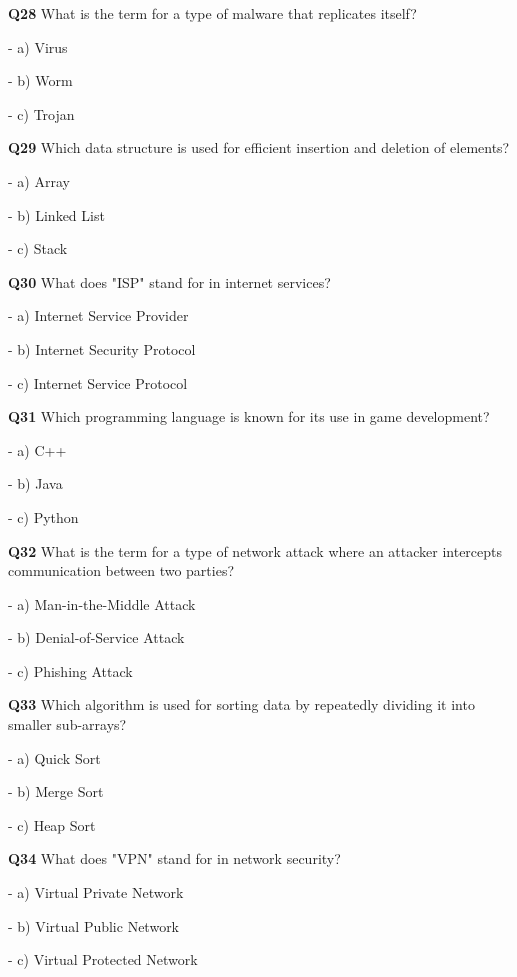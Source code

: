 \textbf{Q28} What is the term for a type of malware that replicates itself?\par
\quad - a) Virus\par
\quad - b) Worm\par
\quad - c) Trojan\par

\textbf{Q29} Which data structure is used for efficient insertion and deletion of elements?\par
\quad - a) Array\par
\quad - b) Linked List\par
\quad - c) Stack\par

\textbf{Q30} What does "ISP" stand for in internet services?\par
\quad - a) Internet Service Provider\par
\quad - b) Internet Security Protocol\par
\quad - c) Internet Service Protocol\par

\textbf{Q31} Which programming language is known for its use in game development?\par
\quad - a) C++\par
\quad - b) Java\par
\quad - c) Python\par

\textbf{Q32} What is the term for a type of network attack where an attacker intercepts communication between two parties?\par
\quad - a) Man-in-the-Middle Attack\par
\quad - b) Denial-of-Service Attack\par
\quad - c) Phishing Attack\par

\textbf{Q33} Which algorithm is used for sorting data by repeatedly dividing it into smaller sub-arrays?\par
\quad - a) Quick Sort\par
\quad - b) Merge Sort\par
\quad - c) Heap Sort\par

\textbf{Q34} What does "VPN" stand for in network security?\par
\quad - a) Virtual Private Network\par
\quad - b) Virtual Public Network\par
\quad - c) Virtual Protected Network\par

